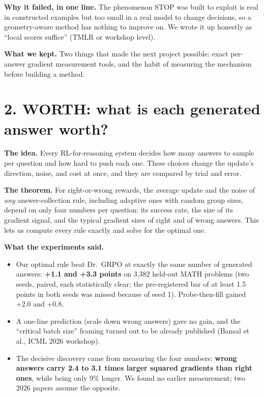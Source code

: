 \documentclass[11pt]{article}
\begin{document}
\textbf{Why it failed, in one line.} The phenomenon STOP was built to exploit is real in constructed examples but too small in a real model to change decisions, so a geometry-aware method has nothing to improve on. We wrote it up honestly as ``local scores suffice'' (TMLR or workshop level).

\textbf{What we kept.} Two things that made the next project possible: exact per-answer gradient measurement tools, and the habit of measuring the mechanism before building a method.

\section*{2. WORTH: what is each generated answer worth?}

\textbf{The idea.} Every RL-for-reasoning system decides how many answers to sample per question and how hard to push each one. These choices change the update's direction, noise, and cost at once, and they are compared by trial and error.

\textbf{The theorem.} For right-or-wrong rewards, the average update and the noise of \emph{any} answer-collection rule, including adaptive ones with random group sizes, depend on only four numbers per question: its success rate, the size of its gradient signal, and the typical gradient sizes of right and of wrong answers. This lets us compute every rule exactly and solve for the optimal one.

\textbf{What the experiments said.}
\begin{itemize}[leftmargin=*,itemsep=1pt]
\item Our optimal rule beat Dr.\ GRPO at exactly the same number of generated answers: \textbf{+1.1 and +3.3 points} on 3{,}382 held-out MATH problems (two seeds, paired, each statistically clear; the pre-registered bar of at least 1.5 points in both seeds was missed because of seed 1). Probe-then-fill gained +2.0 and +0.8.
\item A one-line prediction (scale down wrong answers) gave no gain, and the ``critical batch size'' framing turned out to be already published (Bansal et al., ICML 2026 workshop).
\item The decisive discovery came from measuring the four numbers: \textbf{wrong answers carry 2.4 to 3.1 times larger squared gradients than right ones}, while being only 9\% longer. We found no earlier measurement; two 2026 papers assume the opposite.
\end{itemize}
\end{document}
